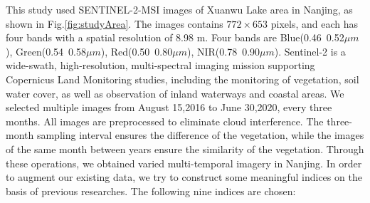 \documentclass{isprs} %
\begin{document}
This study used SENTINEL-2-MSI images of Xuanwu Lake area in Nanjing, as shown in Fig.\ref{fig:studyArea}. The images contains $772\times653$ pixels, and each has four bands with a spatial resolution of 8.98 m. Four bands are Blue(0.46~0.52$\mu m$), Green(0.54~0.58$\mu m$), Red(0.50~0.80$\mu m$), NIR(0.78~0.90$\mu m$). Sentinel-2 is a wide-swath, high-resolution, multi-spectral imaging mission supporting Copernicus Land Monitoring studies, including the monitoring of vegetation, soil water cover, as well as observation of inland waterways and coastal areas.
We selected multiple images from August 15,2016 to June 30,2020, every three months. All images are preprocessed to eliminate cloud interference. The three-month sampling interval ensures the difference of the vegetation, while the images of the same month between years ensure the similarity of the vegetation. Through these operations, we obtained varied multi-temporal imagery in Nanjing. 
In order to augment our existing data, we try to construct some meaningful indices on the basis of previous researches. The following nine indices are chosen: 
\end{document}

